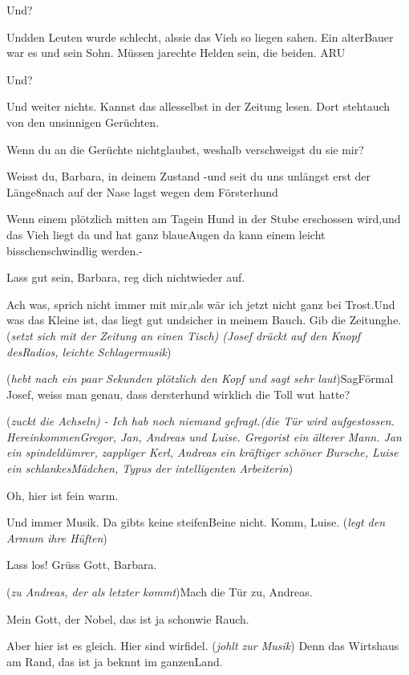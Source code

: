 \documentclass[
	final,
	a4paper,
	ngerman,
	mpinclude = true, %
	twoside = true,
	open = right,
	cleardoublepage = plain,
	DIV = 13,
	BCOR = 1cm,
	titlepage = firstiscover,
	]{scrbook}
\newcommand{\direction}[1]{(\textit{#1})}
\newcommand{\thecharacter}[1]{\textup{\textsc{#1}}\xspace}
\newcommand{\theBarbara}{\thecharacter{Barbara}}
\newcommand{\theJosef}{\thecharacter{Josef}}
\newcommand{\theGregor}{\thecharacter{Gregor}}
\newcommand{\theJan}{\thecharacter{Jan}}
\newcommand{\theLuise}{\thecharacter{Luise}}
\newcommand{\character}[1]{\item[#1]}
\newcommand{\Barbara}{\character{\theBarbara}}
\newcommand{\Josef}{\character{\theJosef}}
\newcommand{\Gregor}{\character{\theGregor}}
\newcommand{\Jan}{\character{\theJan}}
\newcommand{\Luise}{\character{\theLuise}}
\begin{document}
\begin{play}
\Barbara
Und?

\Josef
Undden Leuten wurde schlecht, alssie das Vieh so liegen sahen. Ein alterBauer war es und sein Sohn. Müssen jarechte Helden sein, die beiden. ARU

\Barbara
Und?

\Josef
Und weiter nichts. Kannst das allesselbst in der Zeitung lesen. Dort stehtauch von den unsinnigen Gerüchten.

\Barbara
Wenn du an die Gerüchte nichtglaubst, weshalb verschweigst du sie mir?

\Josef
Weisst du, Barbara, in deinem Zustand -und seit du uns unlängst erst der Länge8nach auf der Nase lagst wegen dem Försterhund

\Barbara
Wenn einem plötzlich mitten am Tagein Hund in der Stube erschossen wird,und das Vieh liegt da und hat ganz blaueAugen da kann einem leicht bisschenschwindlig werden.-

\Josef
Lass gut sein, Barbara, reg dich nichtwieder auf.

\Barbara
Ach was, sprich nicht immer mit mir,als wär ich jetzt nicht ganz bei Trost.Und was das Kleine ist, das liegt gut undsicher in meinem Bauch. Gib die Zeitunghe. \direction{setzt sich mit der Zeitung an einen Tisch) (Josef drückt auf den Knopf desRadios, leichte Schlagermusik}

\Barbara
\direction{hebt nach ein paar Sekunden plötzlich den Kopf und sagt sehr laut}SagFörmal Josef, weiss man genau, dass dersterhund wirklich die Toll wut hatte?

\Josef
\direction{zuckt die Achseln) - Ich hab noch niemand gefragt.(die Tür wird aufgestossen. HereinkommenGregor, Jan, Andreas und Luise. Gregorist ein älterer Mann. Jan ein spindeldümrer, zappliger Kerl, Andreas ein kräftiger schöner Bursche, Luise ein schlankesMädchen, Typus der intelligenten Arbeiterin}

\Gregor
Oh, hier ist fein warm.

\Jan
Und immer Musik. Da gibts keine steifenBeine nicht. Komm, Luise. \direction{legt den Armum ihre Hüften}

\Luise
Lass los! Grüss Gott, Barbara.

\Gregor
\direction{zu Andreas, der als letzter kommt}Mach die Tür zu, Andreas.

\Luise
Mein Gott, der Nobel, das ist ja schonwie Rauch.

\Jan
Aber hier ist es gleich. Hier sind wirfidel. \direction{johlt zur Musik} Denn das Wirtshaus am Rand, das ist ja beknnt im ganzenLand.


\end{play}
\end{document}
